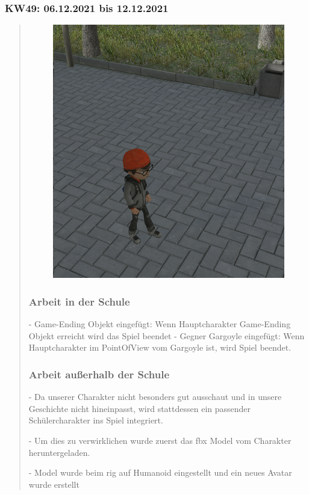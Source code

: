 

\subsubsection{KW49: 06.12.2021 bis 12.12.2021}
\begin{quote}
	\begin{figure}
		\centering
		\includegraphics[width=0.7\linewidth]{img/SemihSoenmez_IMG/screenshot002}
		\caption[Charakter]{}
		\label{fig:screenshot002}
	\end{figure}
	
	\subsubsection*{Arbeit in der Schule}
	- Game-Ending Objekt eingefügt: Wenn Hauptcharakter Game-Ending Objekt erreicht wird das Spiel beendet
	- Gegner Gargoyle eingefügt: Wenn Hauptcharakter im PointOfView vom Gargoyle ist, wird Spiel beendet.
	
	
	\subsubsection*{Arbeit außerhalb der Schule}
	- Da unserer Charakter nicht besonders gut ausschaut und in unsere Geschichte nicht hineinpasst, wird stattdessen ein passender Schülercharakter ins Spiel integriert.
	
		- Um dies zu verwirklichen wurde zuerst das fbx Model vom Charakter heruntergeladen.
		
		- Model wurde beim rig auf Humanoid eingestellt und ein neues Avatar wurde erstellt
		

\end{quote}
